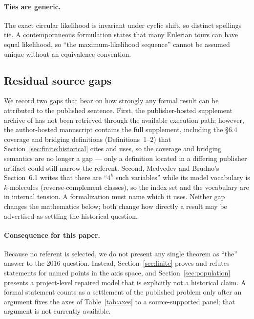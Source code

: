 \paragraph{Ties are generic.}
The exact circular likelihood is invariant under cyclic shift, so distinct
spellings tie. A contemporaneous formulation states that many Eulerian tours can
have equal likelihood, so ``the maximum-likelihood sequence'' cannot be assumed
unique without an equivalence convention.

\subsection{Residual source gaps}

We record two gaps that bear on how strongly any formal result can be attributed
to the published sentence. First, the publisher-hosted supplement archive of
\parencite{shomorony2016} has not been retrieved through the available execution
path; however, the author-hosted manuscript contains the full supplement,
including the \S6.4 coverage and bridging definitions (Definitions~1--2) that
Section~\ref{sec:finite:historical} cites and uses, so the coverage and bridging
semantics are no longer a gap --- only a definition located in a differing
publisher artifact could still narrow the referent. Second,
Medvedev and Brudno's Section~6.1 writes that there are ``$4^k$ such variables''
while its model vocabulary is $k$-molecules (reverse-complement classes), so the
index set and the vocabulary are in internal tension. A formalization must name
which it uses. Neither gap changes the mathematics below; both change how
directly a result may be advertised as settling the historical question.

\paragraph{Consequence for this paper.}
Because no referent is selected, we do not present any single theorem as ``the''
answer to the 2016 question. Instead, Section~\ref{sec:finite} proves and refutes
statements for named points in the axis space, and Section~\ref{sec:population}
presents a project-level repaired model that is explicitly not a historical
claim. A formal statement counts as a settlement of the published problem only
after an argument fixes the axes of Table~\ref{tab:axes} to a source-supported
panel; that argument is not currently available.
